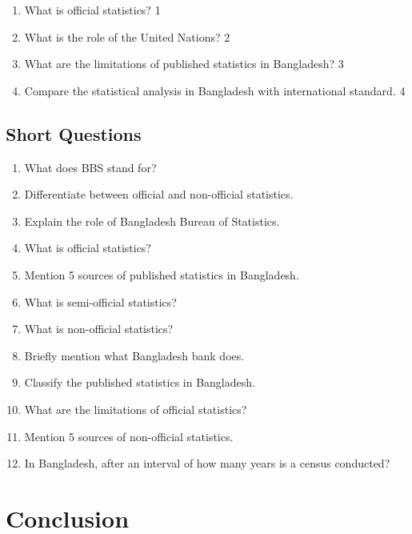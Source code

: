 \documentclass[a4paper,oneside]{book}
\begin{document}
\begin{enumerate}
  \begin{enumerate}
    \item
	What is official statistics?  \hfill 1
    \item
	What is the role of the United Nations? \hfill 2
    \item  
	What are the limitations of published statistics in Bangladesh? \hfill 3
    \item
	Compare the statistical analysis in Bangladesh with international standard. \hfill 4
  \end{enumerate}

 \end{enumerate}
 
 
 \section{Short Questions}
 \begin{enumerate}

    \item What does BBS stand for?
    \item Differentiate between official and non-official statistics.
    \item Explain the role of Bangladesh Bureau of Statistics.
    \item What is official statistics?
    \item Mention 5 sources of published statistics in Bangladesh.
    \item What is semi-official statistics?
    \item What is non-official statistics?
    \item Briefly mention what Bangladesh bank does. 
    \item Classify the published statistics in Bangladesh.
    \item What are the limitations of official statistics?
    \item Mention 5 sources of non-official statistics.
    \item In Bangladesh, after an interval of how many years is a census 
    conducted?
    
    \end{enumerate}

\backmatter
\chapter{Conclusion}
\lipsum[8]

\tableofcontents
\end{document}
